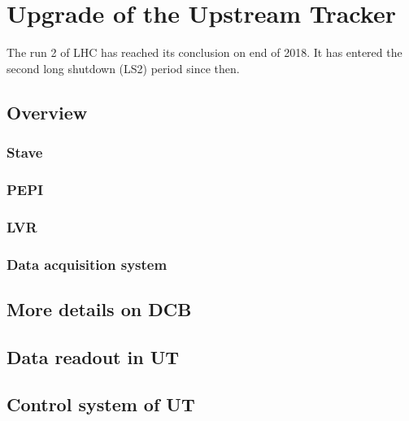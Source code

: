 \chapter{Upgrade of the Upstream Tracker}
\label{ref:ut}

The run 2 of LHC has reached its conclusion on end of 2018.
It has entered the second long shutdown (LS2) period since then.


\section{Overview}
\label{ref:ut:overview}

\subsection{Stave}

\subsection{PEPI}

\subsection{LVR}

\subsection{Data acquisition system}


\section{More details on DCB}


\section{Data readout in UT}


\section{Control system of UT}
